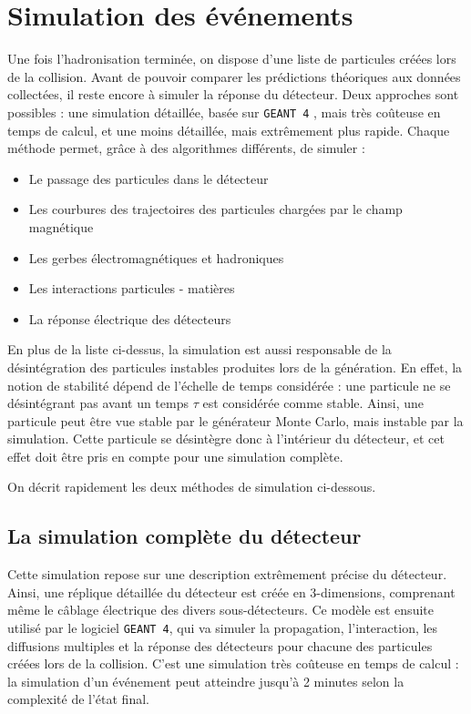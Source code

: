 \section{Simulation des événements}

Une fois l'hadronisation terminée, on dispose d'une liste de particules créées lors de la collision. Avant de pouvoir comparer les prédictions théoriques aux données collectées, il reste encore à simuler la réponse du détecteur. Deux approches sont possibles : une simulation détaillée, basée sur \texttt{GEANT 4} \citep{Agostinelli2003250}, mais très coûteuse en temps de calcul, et une moins détaillée, mais extrêmement plus rapide. Chaque méthode permet, grâce à des algorithmes différents, de simuler :
\begin{itemize}
    \item Le passage des particules dans le détecteur
    \item Les courbures des trajectoires des particules chargées par le champ magnétique
    \item Les gerbes électromagnétiques et hadroniques
    \item Les interactions particules - matières
    \item La réponse électrique des détecteurs
\end{itemize}

En plus de la liste ci-dessus, la simulation est aussi responsable de la désintégration des particules instables produites lors de la génération. En effet, la notion de stabilité dépend de l'échelle de temps considérée : une particule ne se désintégrant pas avant un temps $\tau$ est considérée comme stable. Ainsi, une particule peut être vue stable par le générateur Monte Carlo, mais instable par la simulation. Cette particule se désintègre donc à l'intérieur du détecteur, et cet effet doit être pris en compte pour une simulation complète.

\medskip

On décrit rapidement les deux méthodes de simulation ci-dessous.

\subsection{La simulation complète du détecteur}

Cette simulation repose sur une description extrêmement précise du détecteur. Ainsi, une réplique détaillée du détecteur est créée en 3-dimensions, comprenant même le câblage électrique des divers sous-détecteurs. Ce modèle est ensuite utilisé par le logiciel \texttt{GEANT 4}, qui va simuler la propagation, l'interaction, les diffusions multiples et la réponse des détecteurs pour chacune des particules créées lors de la collision. C'est une simulation très coûteuse en temps de calcul : la simulation d'un événement peut atteindre jusqu'à 2 minutes selon la complexité de l'état final.


